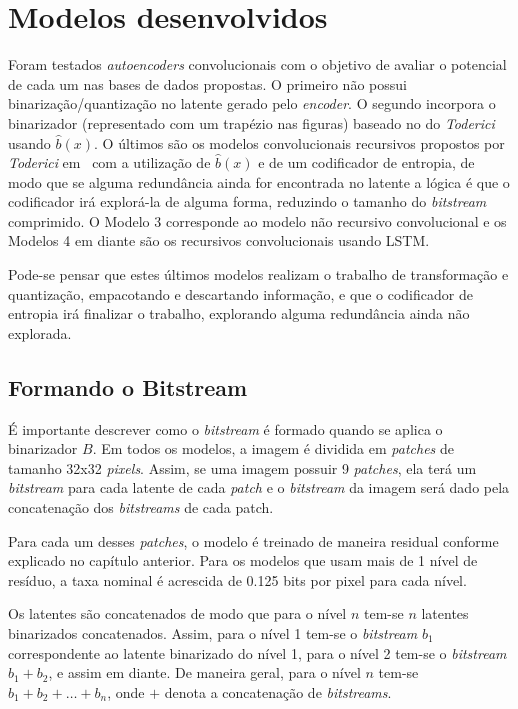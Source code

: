 \section{Modelos desenvolvidos}
Foram testados \textit{autoencoders} convolucionais com o objetivo de avaliar o potencial de cada um nas bases de dados propostas. O primeiro não possui binarização/quantização no latente gerado pelo \textit{encoder}. O segundo incorpora o binarizador (representado com um trapézio nas figuras) baseado no do \textit{Toderici} usando $\hat{b}(x)$. O últimos são os modelos convolucionais recursivos propostos por \textit{Toderici} em~\cite{Variable2016Toderici} com a utilização de $\hat{b}(x)$ e de um codificador de entropia, de modo que se alguma redundância ainda for encontrada no latente a lógica é que o codificador irá explorá-la de alguma forma, reduzindo o tamanho do \textit{bitstream} comprimido. O Modelo 3 corresponde ao modelo não recursivo convolucional e os Modelos 4 em diante são os recursivos convolucionais usando LSTM.

Pode-se pensar que estes últimos modelos realizam o trabalho de transformação e quantização, empacotando e descartando informação, e que o codificador de entropia irá finalizar o trabalho, explorando alguma redundância ainda não explorada.

\subsection{Formando o Bitstream}
É importante descrever como o \textit{bitstream} é formado quando se aplica o binarizador $B$. Em todos os modelos, a imagem é dividida em \textit{patches} de tamanho 32x32 \textit{pixels}. Assim, se uma imagem possuir 9 \textit{patches}, ela terá um \textit{bitstream} para cada latente de cada \textit{patch} e o \textit{bitstream} da imagem será dado pela concatenação dos \textit{bitstreams} de cada patch. 

Para cada um desses \textit{patches}, o modelo é treinado de maneira residual conforme explicado no capítulo anterior. Para os modelos que usam mais de 1 nível de resíduo, a taxa nominal é acrescida de 0.125 bits por pixel para cada nível. 

Os latentes são concatenados de modo que para o nível $n$ tem-se $n$ latentes binarizados concatenados. Assim, para o nível 1 tem-se o \textit{bitstream} $b_1$ correspondente ao latente binarizado do nível 1, para o nível 2 tem-se o \textit{bitstream} $b_1 + b_2$, e assim em diante. De maneira geral, para o nível $n$ tem-se $b_1 + b_2 + \dots + b_n$, onde $+$ denota a concatenação de \textit{bitstreams}. 

